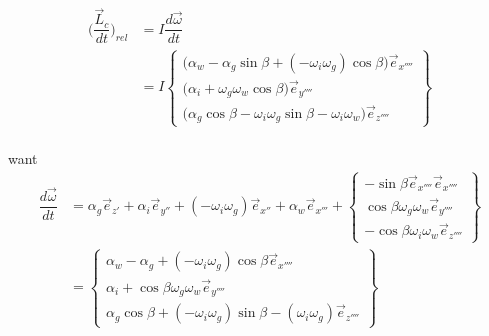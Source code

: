 \documentclass[a4paper,10pt]{article}
\begin{document}
\begin{equation}
\begin{aligned}
\Big( \dfrac{\vec{L}_c}{dt}\Big)_{rel} &= I \dfrac{d\vec{\omega}}{dt}\\
&= I \begin{Bmatrix}
\Big(\alpha_w - \alpha_g \sin{\beta} + (-\omega_i \omega_g)\cos{\beta}\Big)\vec{e}_{x''''}\\
\Big(\alpha_i + \omega_g\omega_w\cos{\beta}\Big)\vec{e}_{y''''}\\
\Big(\alpha_g \cos{\beta} - \omega_i\omega_g\sin{\beta}-\omega_i\omega_w\Big) \vec{e}_{z''''}
\end{Bmatrix}
\end{aligned}
\end{equation}\\
want \\
\begin{equation}
\begin{aligned}
\dfrac{d\vec{\omega}}{dt}&=\alpha_g \vec{e}_{z'} + \alpha_i \vec{e}_{y''} + (-\omega_i\omega_g)\vec{e}_{x''}+\alpha_w\vec{e}_{x'''} + \begin{Bmatrix}
-\sin{\beta}\vec{e}_{x''''}\vec{e}_{x''''}\\
\cos{\beta}\omega_g\omega_w \vec{e}_{y''''}\\
-\cos{\beta}\omega_i\omega_w \vec{e}_{z''''}
\end{Bmatrix}\\
&=\begin{Bmatrix}
\alpha_w - \alpha_g + (-\omega_i\omega_g)\cos{\beta} \vec{e}_{x''''}\\
\alpha_i + \cos{\beta}\omega_g\omega_w \vec{e}_{y''''}\\
\alpha_g\cos{\beta} + (-\omega_i\omega_g)\sin{\beta}- (\omega_i\omega_g) \vec{e}_{z''''}
\end{Bmatrix}
\end{aligned}
\end{equation}
\end{document}
